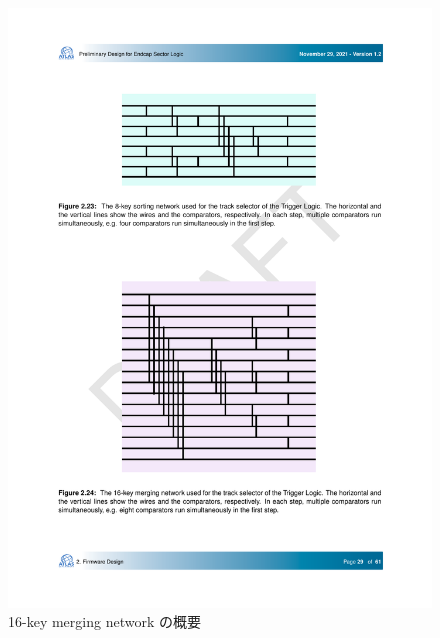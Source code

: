 \begin{figure} 
\centering
\includegraphics[width=16cm]{fig/SL/Sorting_16.pdf}
\caption[16-key merging network の概要]{16-key merging network の概要}
\label{Sorting_16}
\end{figure}


\newpage
